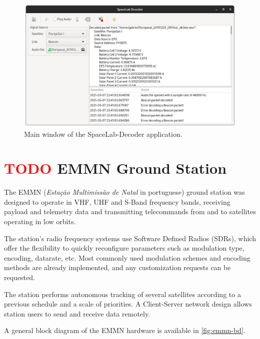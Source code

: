 \begin{figure}[!ht]
    \begin{center}
        \includegraphics[width=\textwidth]{figures/spacelab-decoder.png}
        \caption{Main window of the SpaceLab-Decoder application.}
        \label{fig:spacelab-decoder}
    \end{center}
\end{figure}

\section{ \textcolor{red}{TODO} EMMN Ground Station}

The EMMN (\textit{Estação Multimissão de Natal} in portuguese) ground station \cite{emmn} was designed to operate in VHF, UHF and S-Band frequency bands, receiving payload and telemetry data and transmitting telecommands from and to satellites operating in low orbits.

The station's radio frequency systems use Software Defined Radios (SDRs), which offer the flexibility to quickly reconfigure parameters such as modulation type, encoding, datarate, etc. Most commonly used modulation schemes and encoding methods are already implemented, and any customization requests can be requested.

The station performs autonomous tracking of several satellites according to a previous schedule and a scale of priorities. A Client-Server network design allows station users to send and receive data remotely.

A general block diagram of the EMMN hardware is available in \autoref{fig:emmn-bd}.

